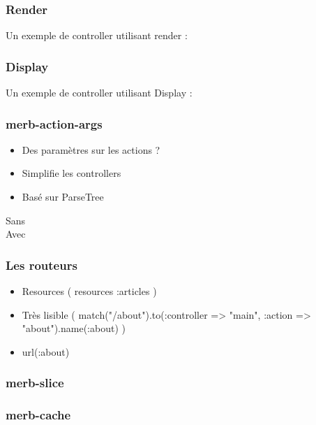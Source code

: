 \documentclass{beamer}
\begin{document}
\begin{frame}
    \frametitle{Render}

    Un exemple de controller utilisant render :

    \begin{center}
        
    \end{center}
\end{frame}

\begin{frame}
    \frametitle{Display}

    Un exemple de controller utilisant Display :


    \begin{center}
        
    \end{center}
\end{frame}

\begin{frame}
    \frametitle{merb-action-args}

    \begin{itemize}
        \item Des paramètres sur les actions ?
        \item Simplifie les controllers
        \item Basé sur ParseTree
    \end{itemize}
\end{frame}

\begin{frame}
    Sans
    \\
            

    Avec
    \\

            
\end{frame}

\begin{frame}
  \frametitle{Les routeurs}

  \begin{itemize}
    \item Resources ( resources :articles )
    \item Très lisible ( match("/about").to(:controller => "main", :action =>
                "about").name(:about) )
    \item url(:about)
  \end{itemize}
\end{frame}

\begin{frame}
    \frametitle{merb-slice}
\end{frame}

\begin{frame}
    \frametitle{merb-cache}
\end{frame}
\end{document}
